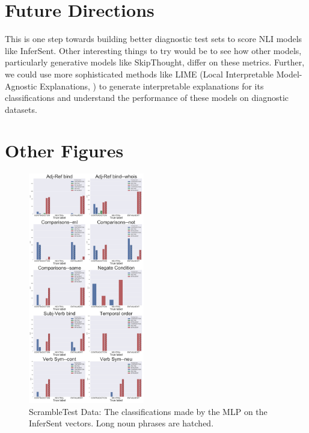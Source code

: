 \documentclass[10pt,letterpaper]{article}
\begin{document}
\section{Future Directions}

This is one step towards building better diagnostic test sets to score NLI models like InferSent. Other interesting things to try would be to see how other models, particularly generative models like SkipThought, differ on these metrics. Further, we could use more sophisticated methods like LIME (Local Interpretable Model-Agnostic Explanations, \cite{ribeiro2016should}) to generate interpretable explanations for its classifications and understand the performance of these models on diagnostic datasets. 





\newpage
\section*{Other Figures}

\begin{figure}[ht!]
\centering
\includegraphics[width=0.45\textwidth]{AllHistsInferSentMLP.png}
\caption{ScrambleTest Data: The classifications made by the MLP on the InferSent vectors. Long noun phrases are hatched.}
\label{fig:IShistMLP}
\end{figure}
\end{document}
